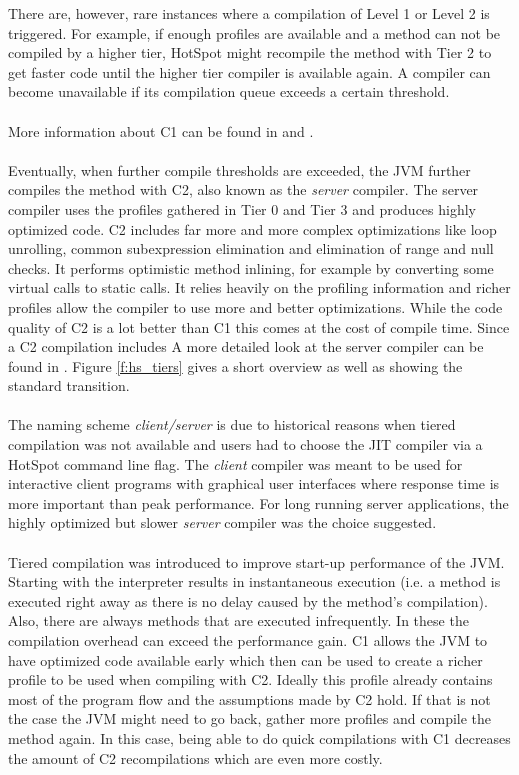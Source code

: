 There are, however, rare instances where a compilation of Level 1 or Level 2 is triggered. For example, if enough profiles are available and a method can not be compiled by a higher tier, HotSpot might recompile the method with Tier 2 to get faster code until the higher tier compiler is available again. A compiler can become unavailable if its compilation queue exceeds a certain threshold.
\\\\
More information about C1 can be found in \cite{client_compiler_talk} and \cite{client_compiler}.
\\\\
Eventually, when further compile thresholds are exceeded, the JVM further compiles the method with C2, also known as the \textit{server} compiler.
The server compiler uses the profiles gathered in Tier 0 and Tier 3 and produces highly optimized code. C2 includes far more and more complex optimizations like loop unrolling, common subexpression elimination and elimination of range and null checks. It performs optimistic method inlining, for example by converting some virtual calls to static calls. It relies heavily on the profiling information and richer profiles allow the compiler to use more and better optimizations.
While the code quality of C2 is a lot better than C1 this comes at the cost of compile time. Since a C2 compilation includes 
A more detailed look at the server compiler can be found in \cite{server_compiler}.
Figure \ref{f:hs_tiers} gives a short overview as well as showing the standard transition.
\\\\
The naming scheme \textit{client/server} is due to historical reasons when tiered compilation was not available and users had to choose the JIT compiler via a HotSpot command line flag. The \textit{client} compiler was meant to be used for interactive client programs with graphical user interfaces where response time is more important than peak performance. For long running server applications, the highly optimized but slower \textit{server} compiler was the choice suggested. 
\\\\
Tiered compilation was introduced to improve start-up performance of the JVM.
Starting with the interpreter results in instantaneous execution (i.e. a method is executed right away as there is no delay caused by the method's compilation). Also, there are always methods that are executed infrequently. In these the compilation overhead can exceed the performance gain. C1 allows the JVM to have optimized code available early which then can be used to create a richer profile to be used when compiling with C2. Ideally this profile already contains most of the program flow and the assumptions made by C2 hold. If that is not the case the JVM might need to go back, gather more profiles and compile the method again. In this case, being able to do quick compilations with C1 decreases the amount of C2 recompilations which are even more costly.

